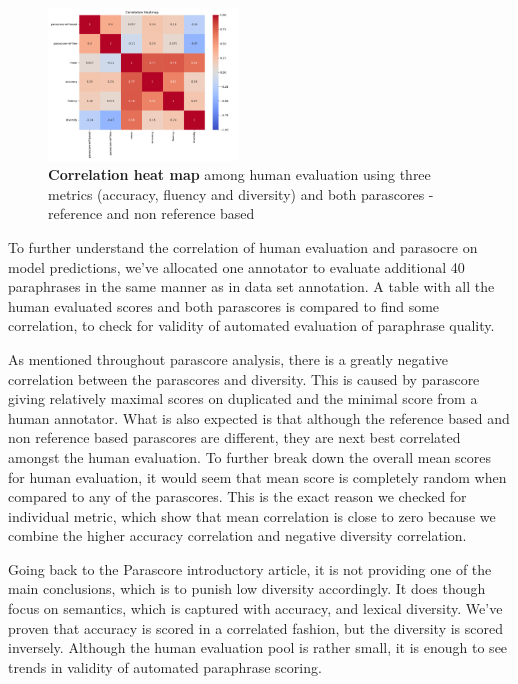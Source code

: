 \documentclass[fleqn,moreauthors,10pt]{ds_report}
\begin{document}
\begin{figure}[ht]
    \centering
    \includegraphics[width=0.45\textwidth]{corr_heatmap.pdf}
    \caption{\textbf{Correlation heat map} among human evaluation using three metrics (accuracy, fluency and diversity) and both parascores - reference and non reference based}
    \label{fig:corr-heatmap}
\end{figure}

To further understand the correlation of human evaluation and parasocre on model predictions, we've allocated one annotator to evaluate additional 40 paraphrases in the same manner as in data set annotation. A table with all the human evaluated scores and both parascores is compared to find some correlation, to check for validity of automated evaluation of paraphrase quality.

As mentioned throughout parascore analysis, there is a greatly negative correlation between the parascores and diversity. This is caused by parascore giving relatively maximal scores on duplicated and the minimal score from a human annotator. What is also expected is that although the reference based and non reference based parascores are different, they are next best correlated amongst the human evaluation. To further break down the overall mean scores for human evaluation, it would seem that mean score is completely random when compared to any of the parascores. This is the exact reason we checked for individual metric, which show that mean correlation is close to zero because we combine the higher accuracy correlation and negative diversity correlation.

Going back to the Parascore introductory article, it is not providing one of the main conclusions, which is to punish low diversity accordingly. It does though focus on semantics, which is captured with accuracy, and lexical diversity. We've proven that accuracy is scored in a correlated fashion, but the diversity is scored inversely. Although the human evaluation pool is rather small, it is enough to see trends in validity of automated paraphrase scoring.
\end{document}
